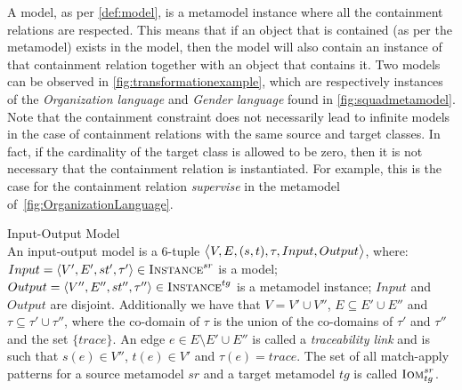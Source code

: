 A model, as per \cref{def:model}, is a metamodel instance where all the containment relations are respected. This means that if an object that is contained (as per the metamodel) exists in the model, then the model will also contain an instance of that containment relation together with an object that contains it. Two models can be observed in \cref{fig:transformationexample}, which are respectively instances of the \emph{Organization language} and \emph{Gender language} found in \cref{fig:squadmetamodel}.\\
Note that the containment constraint does not necessarily lead to infinite models in the case of containment relations with the same source and target classes. In fact, if the cardinality of the target class is allowed to be zero, then it is not necessary that the containment relation is instantiated. For example, this is the case for the containment relation \emph{supervise} in the metamodel of~\cref{fig:OrganizationLanguage}.




\begin{definition}{Input-Output Model\\}
\label{def:input_output_model}
An input-output model is a 6-tuple $\big\langle V,E,(s,t),\tau,Input,\\Output\big\rangle$, where: $Input=\langle V',E',st',\tau'\rangle\in \textsc{Instance}^{sr}$ is a model; $Output=\langle V'',E'',st'',\tau''\rangle\in \textsc{Instance}^{tg}$ is a metamodel instance; $Input$ and $Output$ are disjoint. Additionally we have that $V=V'\cup V''$, $E\subseteq E'\cup E''$ and $\tau\subseteq \tau'\cup \tau''$, where the co-domain of $\tau$ is the union of the co-domains of $\tau'$ and $\tau''$ and the set $\{trace\}$. An edge $e \in E\setminus E'\cup E''$ is called a \emph{traceability link} and is such that $s(e)\in V''$, $t(e)\in V'$ and $\tau(e)=trace$. The set of all match-apply patterns for a source metamodel $sr$ and a target metamodel $tg$ is called $\textsc{Iom}^{sr}_{tg}$.
\end{definition}


